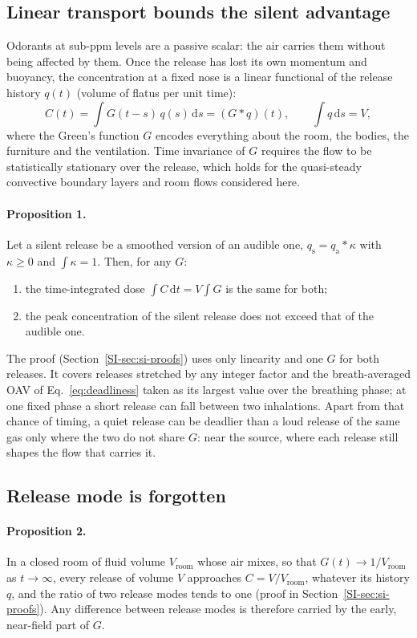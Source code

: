 \subsection{Linear transport bounds the silent advantage}
\label{sec:thm1}
Odorants at sub-ppm levels are a passive scalar: the air carries them without being affected by them. Once the
release has lost its own momentum and buoyancy, the concentration at a fixed nose is a linear functional of the
release history $q(t)$ (volume of flatus per unit time):
\begin{equation}
  C(t) = \int G(t-s)\,q(s)\,\mathrm{d}s = (G * q)(t), \qquad \int q\,\mathrm{d}s = V,
  \label{eq:green}
\end{equation}
where the Green's function $G$ encodes everything about the room, the bodies, the furniture and the ventilation.
Time invariance of $G$ requires the flow to be statistically stationary over the release, which holds for the
quasi-steady convective boundary layers and room flows considered here.

\paragraph{Proposition 1.}
Let a silent release be a smoothed version of an audible one, $q_\mathrm{s} = q_\mathrm{a} * \kappa$ with
$\kappa \ge 0$ and $\int \kappa = 1$. Then, for any $G$:
\begin{enumerate}
  \item[(i)] the time-integrated dose $\int C\,\mathrm{d}t = V\int G$ is the same for both;
  \item[(ii)] the peak concentration of the silent release does not exceed that of the audible one.
\end{enumerate}
The proof (Section~\ref{SI-sec:si-proofs}) uses only linearity and one $G$ for both releases. It covers releases
stretched by any integer factor and the breath-averaged OAV of Eq.~\eqref{eq:deadliness} taken as its largest value
over the breathing phase; at one fixed phase a short release can fall between two inhalations. Apart from that
chance of timing, a quiet release can be deadlier than a loud release of the same gas only where the two do not share
$G$: near the source, where each release still shapes the flow that carries it.

\subsection{Release mode is forgotten}
\label{sec:thm2}
\paragraph{Proposition 2.}
In a closed room of fluid volume $V_\mathrm{room}$ whose air mixes, so that $G(t)\to 1/V_\mathrm{room}$ as
$t\to\infty$, every release of volume $V$ approaches $C = V/V_\mathrm{room}$, whatever its history $q$, and the ratio
of two release modes tends to one (proof in Section~\ref{SI-sec:si-proofs}). Any difference between release modes is
therefore carried by the early, near-field part of $G$.

